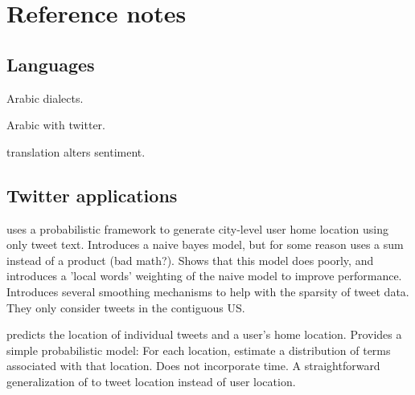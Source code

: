 \documentclass[sigconf,10pt]{acmart}
\begin{document}
\noindent

\noindent

\noindent

\noindent

\noindent

\noindent

\noindent

\noindent

\noindent

\noindent


\newpage
\section{Reference notes}


\subsection{Languages}

\citet{zaidan2014arabic} Arabic dialects.

\citet{refaee2014arabic} Arabic with twitter.

\citet{mohammad2016translation} translation alters sentiment.


\subsection{Twitter applications}

\citet{cheng2010you} uses a probabilistic framework to generate city-level user home location using only tweet text.
Introduces a naive bayes model, but for some reason uses a sum instead of a product (bad math?).
Shows that this model does poorly,
and introduces a 'local words' weighting of the naive model to improve performance.
Introduces several smoothing mechanisms to help with the sparsity of tweet data.
They only consider tweets in the contiguous US.

\citet{kinsella2011m} predicts the location of individual tweets and a user's home location.
Provides a simple probabilistic model: 
For each location, estimate a distribution of terms associated with that location.
Does not incorporate time.
A straightforward generalization of \citet{cheng2010you} to tweet location instead of user location.
\end{document}
